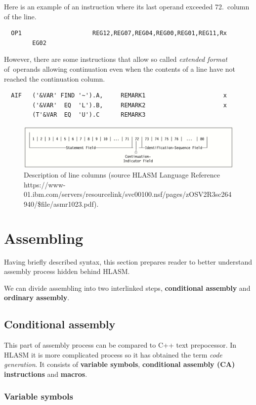 Here is an example of an instruction where its last operand exceeded 72.~column of the line.
\begin{verbatim}
  OP1                    REG12,REG07,REG04,REG00,REG01,REG11,Rx
        EG02
\end{verbatim} 
However, there are some instructions that allow so called \textit{extended format} of~operands allowing continuation even when the contents of a line have not reached  the continuation column.
\begin{verbatim}
  AIF   ('&VAR' FIND '~').A,     REMARK1                      x
        ('&VAR'  EQ  'L').B,     REMARK2                      x
        (T'&VAR  EQ  'U').C      REMARK3 
\end{verbatim} 
\begin{figure}[h]\centering
	\includegraphics[scale=0.4]{img/line}
	\caption{Description of line columns (source HLASM Language Reference https://www-01.ibm.com/servers/resourcelink/\-svc00100.nsf/\-pages/\-zOSV2R3sc264940/\-\$file/\-asmr1023.pdf).}
	\label{fig01:line}
\end{figure}


\section{Assembling}

Having briefly described syntax, this section prepares reader to better understand assembly process hidden behind HLASM. 

We can divide assembling into two interlinked steps, \textbf{conditional assembly} and \textbf{ordinary assembly}.

\subsection{Conditional assembly}

This part of assembly process can be compared to C++ text prepocessor. In HLASM it is more complicated process so it has obtained the term \textit{code generation}. It consists of \textbf{variable symbols}, \textbf{conditional assembly (CA) instructions} and \textbf{macros}. 


\subsubsection{Variable symbols}

